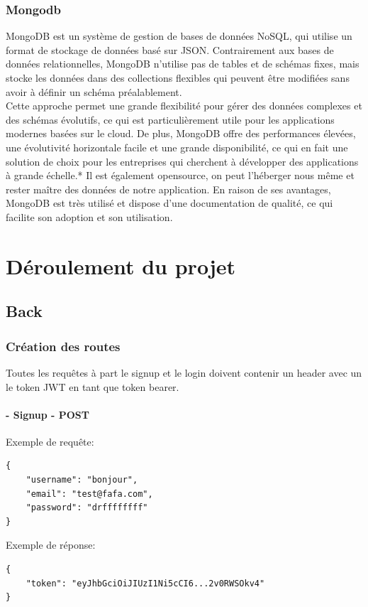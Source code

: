 \documentclass[a4paper,12pt]{report}
\begin{document}
\subsection{Mongodb}
MongoDB est un système de gestion de bases de données NoSQL, qui utilise un format de stockage de données basé sur JSON. Contrairement aux bases de données relationnelles, MongoDB n'utilise pas de tables et de schémas fixes, mais stocke les données dans des collections flexibles qui peuvent être modifiées sans avoir à définir un schéma préalablement.\\
Cette approche permet une grande flexibilité pour gérer des données complexes et des schémas évolutifs, ce qui est particulièrement utile pour les applications modernes basées sur le cloud. De plus, MongoDB offre des performances élevées, une évolutivité horizontale facile et une grande disponibilité, ce qui en fait une solution de choix pour les entreprises qui cherchent à développer des applications à grande échelle.*
Il est également opensource, on peut l'héberger nous même et rester maître des données de notre application.
En raison de ses avantages, MongoDB est très utilisé et dispose d'une documentation de qualité, ce qui facilite son adoption et son utilisation.

\chapter{Déroulement du projet}

\section{Back}
\subsection{Création des routes}
Toutes les requêtes à part le signup et le login doivent contenir un header avec un le token JWT en tant que token bearer.
\subsubsection{- Signup - POST}
Exemple de requête:
\begin{lstlisting}
{
	"username": "bonjour",
	"email": "test@fafa.com",
	"password": "drffffffff"
}
\end{lstlisting}

Exemple de réponse:
\begin{lstlisting}
{
	"token": "eyJhbGciOiJIUzI1Ni5cCI6...2v0RWSOkv4"
}
\end{lstlisting}
\end{document}
